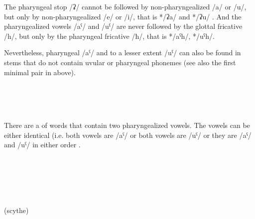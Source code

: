 The pharyngeal stop /ʡ/ cannot be followed by non-pharyngealized /a/ or /u/, but only by non-pharyngealized /e/ or /i/, that is */ʡa/ and */ʡu/ . And the pharyngealized vowels /aˁ/ and /uˁ/ are never followed by the glottal fricative /h/, but only by the pharyngeal fricative /ħ/, that is */aˁh/, */uˁh/.

Nevertheless, pharyngeal /aˁ/ and to a lesser extent /uˁ/ can also be found in stems that do not contain uvular or pharyngeal phonemes  (see also the first minimal pair in  above).
%
\begin{exe}
	\ex	\label{ex:not uvular phon}
\TabPositions{12em}
		 	\tab 		{} 	\\
		 	\tab 		{} 	\\
		 	\tab 		{} 	\\
		 	\tab 		{} 	

\end{exe}

There are a  of words that contain two pharyngealized vowels. The vowels can be either identical (i.e. both vowels are /aˁ/ or both vowels are /uˁ/ or they are /aˁ/ and /uˁ/ in either order .
%
\begin{exe}
	\ex	\label{ex:two pharyngealized vowels phon}
\TabPositions{18em}
		 	\tab 	{} 	\\
		 		\tab 	{} 	\\
		 		\tab 	{} 			\\
		 		\tab 	{} 	\\
		  	\tab {} 	 \\
		(scythe) 
\end{exe}

